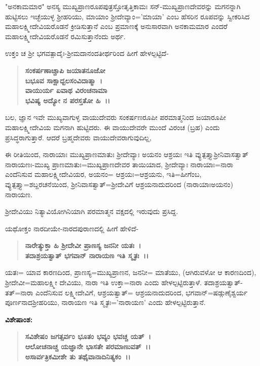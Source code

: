 "ಅನಕಾಮಮಾರ" ಅನಸ್ಯ ಮುಖ್ಯಪ್ರಾಣರೂಪಪುತ್ರಸ್ತೋತೃತ್ತಿಕಾಮಃ ಸನ್-ಮುಖ್ಯಪ್ರಾಣದೇವರನ್ನು ಮಗನನ್ನಾಗಿ ಹುಟ್ಟಿಸಲು ಇಚ್ಛೆಯುಳ್ಳ ಶ‍್ರೀಹರಿಯು, ಮಾಯಾಂ ಶ‍್ರೀದೇವ್ಯಾಂ='ಮಾಯಾ' ಎಂಬ ಹೆಸರಿನ ರೂಪವನ್ನು ಸ್ವೀಕರಿಸಿದ ಮಹಾಲಕ್ಷ್ಮೀದೇವಿಯರೊಡನೆ ಕ್ರೀಡಿಸುತ್ತಾನೆ ಎಂಬ ಪ್ರಮಾಣಕ್ಕೆ ಅನುಸಾರವಾಗಿ ಅನಕಾಮಮಾರ ಎಂದರೆ ಮಹಾಲಕ್ಷ್ಮೀದೇವಿಯರೊಡನೆ ರಮಿಸುತ್ತಾನೆಂದು ಅರ್ಥ.

ಉಕ್ತಂ ಚ ಶ‍್ರೀ ಭಗವತ್ಪಾದೈಃ-ಶ‍್ರೀಮದಾನಂದತೀರ್ಥರಿಂದ ಹೀಗೆ ಹೇಳಲ್ಪಟ್ಟಿದೆ-

\begin{verse}
\textbf{ಸಂಕರ್ಷಣಾಚ್ಚಾಪಿ ಜಯಾತನೂಜೋ}\\\textbf{ಬಭೂವ ಸಾಕ್ಷಾದ್ಬಲಸಂವಿದಾತ್ಮಾ~।}\\\textbf{ವಾಯುರ್ಯ ಏವಾಥ ವಿರಂಚನಾಮಾ}\\\textbf{ಭವಿಷ್ಯ ಅದ್ಯೋ ನ ಪರಸ್ತತೋ ಹಿ~।।}
\end{verse}

\noindent
ಬಲ, ಜ್ಞಾನ ಇವೇ ಮುಖ್ಯವಾಗುಳ್ಳ ವಾಯುದೇವರು ಸಂಕರ್ಷಣರೂಪೀ ಪರಮಾತ್ಮನಿಂದ ಜಯಾರೂಪೀ ಮಹಾಲಕ್ಷ್ಮೀದೇವಿಯ ಮಗನಾಗಿ ಹುಟ್ಟಿದರು. ಈ ವಾಯುದೇವರೇ ಮುಂದೆ ವಿರಂಚ (ಬ್ರಹ) ಎಂದು ಪ್ರಸಿದ್ಧರಾಗುತ್ತಾರೆ. ಆದರೆ ಬ್ರಹ್ಮದೇವರು ವಾಯುದೇವರಾಗುವುದಿಲ್ಲ,

ಈ ರೀತಿಯಿಂದ, ನಾರಾಯಾಃ ಮುಖ್ಯಪ್ರಾಣಮಾತುಃ ಶ‍್ರೀದೇವ್ಯಾಃ ಅಯನಂ ಆಶ್ರಯಃ ಇತಿ ವ್ಯುತ್ಪತ್ತ್ಯಾಶ‍್ರೀನಿವಾಸತ್ವಾತ್ ನಾರಾಯಣಃ-ಮುಖ್ಯ ಪ್ರಾಣಮಾತುಃ=ಮುಖ್ಯ\-ಪ್ರಾಣದೇವರ ತಾಯಿಯಾದ, ಶ‍್ರೀದೇವ್ಯಾಃ ನಾರಾಯಾಃ=ನಾರಾ ಎಂದೆನಿಸುವ ಮಹಾಲಕ್ಷ್ಮೀದೇವಿಯರ, ಅಯನಂ= ಆಶ್ರಯಃ=ಆಶ್ರಯನು, ಇತಿ=ಹೀಗೆಂಬ, ವ್ಯುತ್ಪತ್ತ್ಯಾ=ಶಬ್ದ\-ರಚನೆಯಿಂದ, ಶ‍್ರೀನಿವಾಸತ್ವಾತ್=ಶ‍್ರೀದೇವಿಗೆ ಆಶ್ರಯನಾದುದರಿಂದ (ನಾರಾಯಾಃ\break ಅಯನಂ) ನಾರಾಯಣ.

ಶ‍್ರೀದೇವಿಯು ನಿತ್ಯಾವಿಯೋಗಿನಿಯಾಗಿ ಪರಮಾತ್ಮನ ವಕ್ಷದಲ್ಲಿ ಇರುವುದು ಪ್ರಸಿದ್ದ.

ಯಥೋಕ್ತಂ ನಾರದೀಯೇ-ನಾರದಪುರಾಣದಲ್ಲಿ ಹೀಗೆ ಹೇಳಿದೆ-

\begin{verse}
\textbf{ನಾರೇತ್ಯುಕ್ತಾ ಹಿ ಶ‍್ರೀದೇವೀ ಪ್ರಾಣಸ್ಯ ಜನನೀ ಯತಃ~।}\\\textbf{ತದಾಶ್ರಯತ್ವಾತ್ ಭಗವಾನ್ ನಾರಾಯಣ ಇತಿ ಸ್ಮೃತಃ~।।}
\end{verse}

\noindent
ಯತಃ= ಯಾವ ಕಾರಣದಿಂದ, ಪ್ರಾಣಸ್ಯ=ಮುಖ್ಯಪ್ರಾಣನ, ಜನನೀ= ಮಾತೆಯು, (ಆಗಿರು\-ವಳೋ ಆ ಕಾರಣದಿಂದ), ಶ‍್ರೀದೇವೀ=ಮಹಾಲಕ್ಷ್ಮೀ ದೇವಿಯು, ನಾರಾ ಇತಿ ಉಕ್ತಾ=ನಾರಾ ಎಂದು ಹೇಳಲ್ಪಟ್ಟಿರುತ್ತಾಳೆ. ತದಾಶ್ರಯತ್ವಾತ್-ತತ್=ನಾರಾ ಎಂದೆನಿಸುವ ಲಕ್ಷ್ಮೀದೇವಿಗೆ, ಆಶ್ರಯತ್ವಾತ್= ಆಶ್ರಯನಾದುದರಿಂದ, ಭಗವಾನ್=ಷಡ್ಗುಣೈಶ್ವರ್ಯ ಪೂರ್ಣನಾದ\break ಶ‍್ರೀಹರಿಯು, ನಾರಾಯಣ ಇತಿ ಸ್ಮೃತಃ='ನಾರಾಯಣ' ಎಂದು ಹೇಳಲ್ಪಟ್ಟಿರುತ್ತಾನೆ.

\noindent
\textbf{ವಿಶೇಷಾಂಶ:\enginline{-}}

\begin{verse}
\textbf{ಸವಿಶೇಷಂ ಜಗತ್ಸರ್ವಂ ಭೂತಂ ಭವ್ಯಂ ಭವಚ್ಚ ಯತ್~।}\\\textbf{ಆಲೋಚನಾಚ್ಚ ಯಜ್ಞಾನೇ ಭಾಸತೇ ಪರಮಾಣುವತ್~।।}\\\textbf{ಅಸಾರ್ವತ್ರಿಕಮೀಶೇ ತು ತಥೈವಾನಾದಿನಿತ್ಯಕಂ~।।}
\end{verse}

